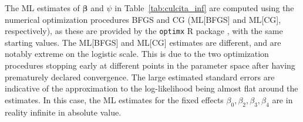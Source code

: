 \documentclass[11pt, a4paper]{article}
\newcommand*{\bb}{\boldsymbol}
\theoremstyle{example} \newtheorem{example}{Example}[section]
\theoremstyle{theorem} \newtheorem{theorem}{Theorem}[section]
\def\bbeta{\bb{\beta}}
\begin{document}
The ML estimates of $\bbeta$ and $\psi$ in Table~\ref{tab:culcita_inf}
are computed using the numerical optimization procedures BFGS and CG
(ML[BFGS] and ML[CG], respectively), as these are provided by the
\texttt{optimx} R package \citep[see][Section 3 for
details]{nash:2014}, with the same starting values. The
ML[BFGS] and ML[CG] estimates are different, and are notably extreme
on the logistic scale. This is due to the two optimization procedures
stopping early at different points in the parameter space after having
prematurely declared convergence. The large estimated standard errors
are indicative of the approximation to the log-likelihood being almost
flat around the estimates. In this case, the ML estimates for the
fixed effects $\beta_0, \beta_2, \beta_3, \beta_4$ are in reality
infinite in absolute value.
\end{document}
